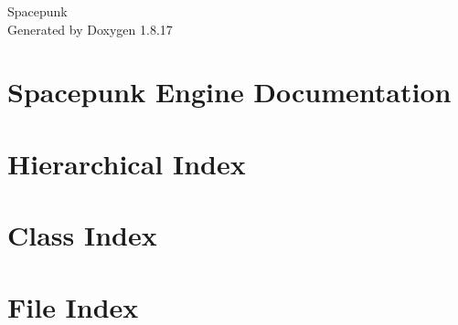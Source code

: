 \let\mypdfximage\pdfximage\def\pdfximage{\immediate\mypdfximage}\documentclass[twoside]{book}
\newcommand{\+}{\discretionary{\mbox{\scriptsize$\hookleftarrow$}}{}{}}
\newcommand{\clearemptydoublepage}{%
  \newpage{\pagestyle{empty}\cleardoublepage}%
}
\begin{document}
\hypersetup{pageanchor=false,
             bookmarksnumbered=true,
             pdfencoding=unicode
            }
\begin{titlepage}
\vspace*{7cm}
\begin{center}%
{\Large Spacepunk }\\
\vspace*{1cm}
{\large Generated by Doxygen 1.8.17}\\
\end{center}
\end{titlepage}
\clearemptydoublepage
{}
\tableofcontents
\clearemptydoublepage
{}
\hypersetup{pageanchor=true}

\chapter{Spacepunk Engine Documentation}
\label{index}\hypertarget{index}{}
\chapter{Hierarchical Index}

\chapter{Class Index}

\chapter{File Index}

\end{document}
